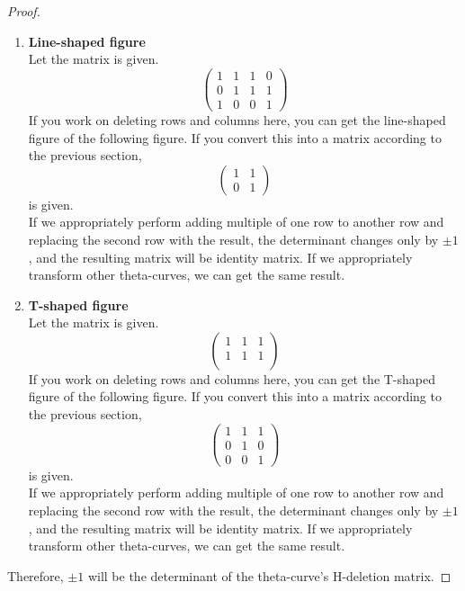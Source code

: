 \documentclass{article}
\begin{document}
\begin{proof}
\begin{enumerate}
    \item \textbf{Line-shaped figure}\\
    Let the matrix is given.
    $$\begin{pmatrix}
        1 & 1 & 1 & 0\\
        0 & 1 & 1 & 1\\
        1 & 0 & 0 & 1
    \end{pmatrix}$$
    If you work on deleting rows and columns here, you can get the line-shaped figure of the following figure. If you convert this into a matrix according to the previous section,
    $$\begin{pmatrix}
        1 & 1 \\
        0 & 1
    \end{pmatrix}$$
    is given.\\
    If we appropriately perform adding multiple of one row to another row and replacing the second row with the result, the determinant changes only by $\pm 1$, and the resulting matrix will be identity matrix. If we appropriately transform other theta-curves, we can get the same result.
    \item \textbf{T-shaped figure}\\
    Let the matrix is given.
    $$\begin{pmatrix}
        1 & 1 & 1\\
        1 & 1 & 1\\
    \end{pmatrix}$$
    If you work on deleting rows and columns here, you can get the T-shaped figure of the following figure. If you convert this into a matrix according to the previous section,
    $$\begin{pmatrix}
        1 & 1 & 1\\
        0 & 1 & 0\\
        0 & 0 & 1
    \end{pmatrix}$$
    is given.\\
    If we appropriately perform adding multiple of one row to another row and replacing the second row with the result, the determinant changes only by $\pm 1$, and the resulting matrix will be identity matrix. If we appropriately transform other theta-curves, we can get the same result.
\end{enumerate}
Therefore, $\pm 1$ will be the determinant of the theta-curve's H-deletion matrix.


\end{proof}
\end{document}
